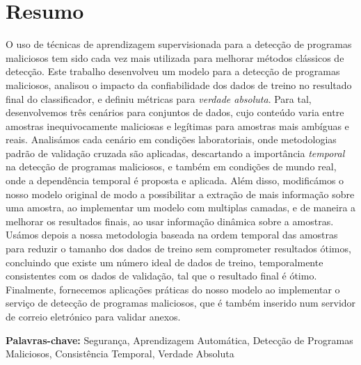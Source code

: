 
\section*{Resumo}


O uso de técnicas de aprendizagem supervisionada para a detecção de programas maliciosos tem sido cada vez mais utilizada para melhorar métodos clássicos de detecção.
Este trabalho desenvolveu um modelo para a detecção de programas maliciosos, analisou o impacto da confiabilidade dos dados de treino no resultado final do classificador, e definiu métricas para \textit{verdade absoluta}.
Para tal, desenvolvemos três cenários para conjuntos de dados, cujo conteúdo varia entre amostras inequivocamente maliciosas e legítimas para amostras mais ambíguas e reais.
Analisámos cada cenário em condições laboratoriais, onde metodologias padrão de validação cruzada são aplicadas, descartando a importância \textit{temporal} na detecção de programas maliciosos, e também em condições de mundo real, onde a dependência temporal é proposta e aplicada.
Além disso, modificámos o nosso modelo original de modo a possibilitar a extração de mais informação sobre uma amostra, ao implementar um modelo com multiplas camadas, e de maneira a melhorar os resultados finais, ao usar informação dinâmica sobre a amostras.
Usámos depois a nossa metodologia baseada na ordem temporal das amostras para reduzir o tamanho dos dados de treino sem comprometer resultados ótimos, concluindo que existe um número ideal de dados de treino, temporalmente consistentes com os dados de validação, tal que o resultado final é ótimo.
Finalmente, fornecemos aplicações práticas do nosso modelo ao implementar o serviço de detecção de programas maliciosos, que é também inserido num servidor de correio eletrónico para validar anexos.

\vfill

\textbf{\Large Palavras-chave:} Segurança, Aprendizagem Automática, Detecção de Programas Maliciosos, Consistência Temporal, Verdade Absoluta

